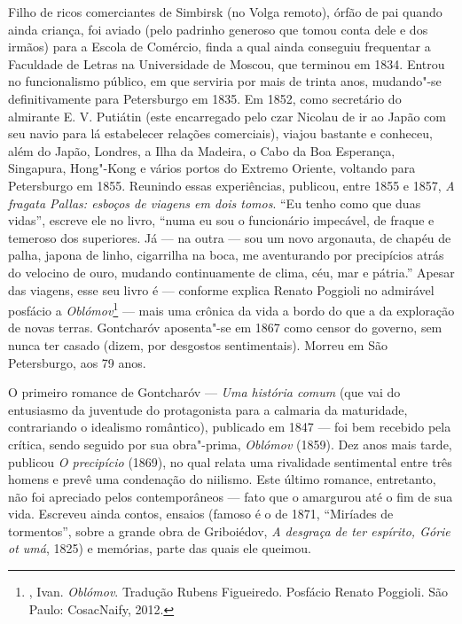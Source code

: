 Filho de ricos comerciantes de Simbirsk (no Volga remoto), órfão de
pai quando ainda criança, foi aviado (pelo padrinho generoso que
tomou conta dele e dos irmãos) para a Escola de Comércio, finda a
qual ainda conseguiu frequentar a Faculdade de Letras na Universidade
de Moscou, que terminou em 1834. Entrou no funcionalismo público, em
que serviria por mais de trinta anos, mudando"-se definitivamente para
Petersburgo em 1835. Em 1852, como secretário do almirante E. V.
Putiátin (este encarregado pelo czar Nicolau  de ir ao
Japão com seu navio para lá estabelecer relações comerciais), viajou
bastante e conheceu, além do Japão, Londres, a Ilha da Madeira, o Cabo da Boa
Esperança, Singapura, Hong"-Kong e vários portos do Extremo Oriente,
voltando para Petersburgo em 1855. Reunindo essas experiências,
publicou, entre 1855 e 1857, \emph{A fragata Pallas: esboços de
viagens em dois tomos}. ``Eu tenho como que duas vidas'', escreve
ele no livro, ``numa eu sou o funcionário impecável, de fraque e
temeroso dos superiores. Já --- na outra --- sou um novo argonauta,
de chapéu de palha, japona de linho, cigarrilha na boca, me
aventurando por precipícios atrás do velocino de ouro, mudando
continuamente de clima, céu, mar e pátria.'' Apesar das viagens,
esse seu livro é --- conforme explica Renato Poggioli no admirável
posfácio a \emph{Oblómov}\footnote{, Ivan.
\emph{Oblómov}. Tradução Rubens Figueiredo. Posfácio Renato Poggioli.
São Paulo: CosacNaify, 2012.} --- mais uma crônica da vida a bordo do
que a da exploração de novas terras. Gontcharóv aposenta"-se em 1867
como censor do governo, sem nunca ter casado (dizem, por desgostos
sentimentais). Morreu em São Petersburgo, aos 79 anos. 

O primeiro romance  de Gontcharóv --- \emph{Uma história comum} (que vai do entusiasmo da juventude do protagonista para a calmaria da maturidade, contrariando o idealismo romântico), publicado em 1847 --- foi bem recebido pela crítica, sendo seguido por sua obra"-prima, \emph{Oblómov} (1859). Dez anos mais tarde, publicou \emph{O precipício} (1869), no qual relata uma rivalidade sentimental entre três homens e prevê uma condenação do niilismo. Este último romance, entretanto, não foi apreciado pelos contemporâneos --- fato que o amargurou até o fim de sua vida. Escreveu ainda contos, ensaios (famoso é o de 1871, ``Miríades de tormentos'', sobre a grande obra de Griboiédov, \emph{A desgraça de ter espírito, Górie ot umá}, 1825) e memórias, parte das quais ele queimou. 

